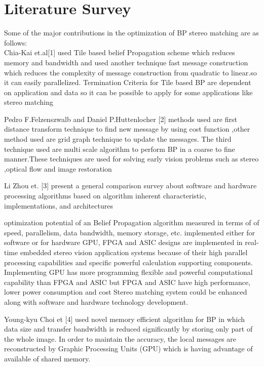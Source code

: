 \chapter{Literature Survey}

Some of the major contributions in the optimization of BP stereo matching are as follows:
\\Chia-Kai et.al[1] used Tile based belief Propagation scheme which reduces memory
 and bandwidth and used another technique fast message construction which reduces the complexity of message construction from quadratic to linear.so it can easily parallelized.
Termination Criteria for Tile based BP are dependent on application and data so it can be possible to apply for some applications like stereo matching

Pedro F.Felzenszwalb and Daniel P.Huttenlocher [2] methods used are first distance transform technique to find new message by using cost function ,other method used are grid graph technique to update the messages.
The third technique used are multi scale algorithm to perform BP in a coarse to fine manner.These techniques are used for solving early vision problems such as stereo ,optical flow and image restoration

Li Zhou et. [3] present a general comparison survey about software and hardware processing algorithms based on algorithm inherent characteristic, implementations, and architectures

optimization potential of an Belief Propagation algorithm measured  in terms of
of speed, parallelism, data bandwidth, memory storage, etc. implemented either for  software or  for hardware
 GPU, FPGA and ASIC designs are  implemented in real-time embedded stereo vision application systems because of their high parallel processing capabilities and specific powerful calculation supporting components.
Implementing GPU has more programming flexible and powerful computational capability than FPGA and ASIC but FPGA and ASIC  have high performance, lower power consumption and cost
Stereo matching system could be enhanced along with software and hardware technology development.


Young-kyu Choi et [4] used novel memory efficient algorithm for BP in which data size and transfer bandwidth is reduced significantly by storing only part of the whole image.
In order to maintain the accuracy, the local messages are reconstructed by Graphic Processing Units (GPU) which is having advantage of available of shared memory.



